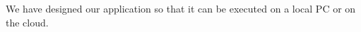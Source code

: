 \documentclass[sigconf,nonacm,11pt]{acmart}
\begin{document}
We have designed our application so that it can be executed on a local PC or on the cloud.  








\end{document}
